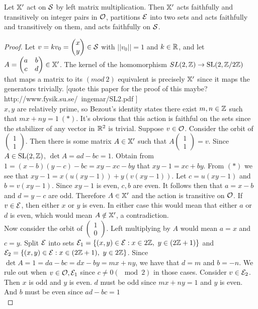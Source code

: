 \documentclass[]{article}
\begin{document}
\begin{lem}
Let $\mathbb{X}'$ act on $\mathcal{S}$ by left matrix multiplication. Then $\mathbb{X}'$ acts faithfully and transitively on integer pairs in $\mathcal{O}$, partitions $\mathcal{E}$ into two sets and acts faithfully and transitively on them, and acts faithfully on $\mathcal{S}$.
\begin{proof}
Let $v=kv_0=\begin{pmatrix}x \\ y\end{pmatrix}\in\mathcal{S}$ with $||v_0||=1$ and $k\in\mathbb{R}$, and let $A=\begin{pmatrix}a & b \\ c & d
\end{pmatrix}\in\mathbb{X}'$. The kernel of the homomorphism $SL(2, \mathbb{Z})\rightarrow \mathrm{SL}(2,\mathbb{Z}/2\mathbb{Z})$ that maps a matrix to its $(mod~2)$ equivalent is precisely $\mathbb{X}'$ since it maps the generators trivially. [quote this paper for the proof of this maybe? http://www.fysik.su.se/~ingemar/SL2.pdf ]\\
$x,y$ are relatively prime, so Bezout's identity states there exist $m,n\in\mathbb{Z}$ such that $mx+ny=1~(*)$. It's obvious that this action is faithful on the sets since the stabilizer of any vector in $\mathbb{R}^2$ is trivial. Suppose $v\in\mathcal{O}$. Consider the orbit of $\begin{pmatrix}1 \\1 \end{pmatrix}$. Then there is some matrix $A\in\mathbb{X}'$ such that $A\begin{pmatrix}1\\1\end{pmatrix}=v$. Since $A\in\mathrm{SL}(2,\mathbb{Z})$, $\det A = ad-bc=1$. Obtain from $1=(x-b)(y-c)-bc=xy-xc-by$ that $xy-1=xc+by$. From $(*)$ we see that $xy-1=x(u(xy-1))+y(v(xy-1))$. Let $c=u(xy-1)$ and $b=v(xy-1)$. Since $xy-1$ is even, $c,b$ are even. It follows then that $a=x-b$ and $d=y-c$ are odd. Therefore $A\in \mathbb{X}'$ and the action is transitive on $\mathcal{O}$. If $v\in\mathcal{E}$, then either $x$ or $y$ is even. In either case this would mean that either $a$ or $d$ is even, which would mean $A\notin\mathbb{X}'$, a contradiction.\\
Now consider the orbit of $\begin{pmatrix}1\\0\end{pmatrix}$. Left multiplying by $A$ would mean $a=x$ and $c=y$. Split $\mathcal{E}$ into sets $\mathcal{E}_1=\{(x,y)\in\mathcal{E} :x\in2\mathbb{Z},~y\in(2\mathbb{Z}+1) \}$ and $\mathcal{E}_2=\{(x,y)\in\mathcal{E}:x\in(2\mathbb{Z}+1),~y\in2\mathbb{Z} \}$. Since $\det A=1=da-bc=dx-by=mx+ny$, we have that $d=m$ and $b=-n$. We rule out when $v\in\mathcal{O},\mathcal{E}_1$ since $c\neq 0 (\mod 2)$ in those cases. Consider $v\in\mathcal{E}_2$. Then $x$ is odd and $y$ is even. $d$ must be odd since $mx+ny=1$ and $y$ is even. And $b$ must be even since $ad-bc=1$\\

\end{proof}
\end{lem}
\end{document}
